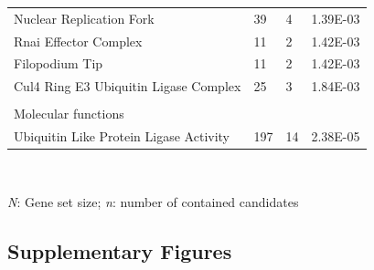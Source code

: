 \begin{refsection}
\begin{table}[H]
\begin{tabular}{@{}llll@{}}
Nuclear Replication Fork               & 39   & 4  & 1.39E-03         \\
Rnai Effector Complex                  & 11   & 2  & 1.42E-03         \\
Filopodium Tip                         & 11   & 2  & 1.42E-03         \\
Cul4 Ring E3 Ubiquitin Ligase Complex  & 25   & 3  & 1.84E-03         \\
                                       &      &    &                  \\
Molecular functions                    &      &    &                  \\
Ubiquitin Like Protein Ligase Activity & 197  & 14 & 2.38E-05         \\ \hline
\end{tabular}\\
{\begin{flushleft}
\scriptsize \textit{N}: Gene set size; \textit{n}: number of contained candidates
\end{flushleft}}
\end{table}


\newpage
\subsection*{Supplementary Figures}


\end{refsection}
